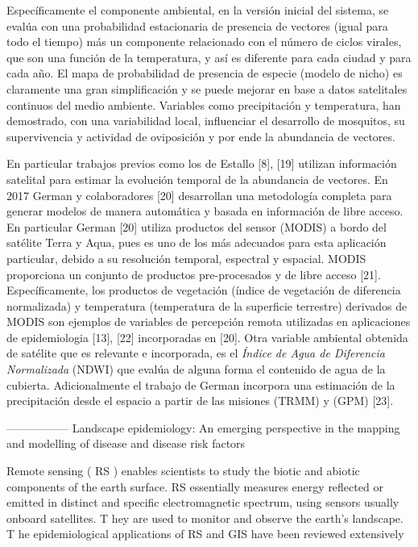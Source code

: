 Específicamente el componente ambiental, en la versión inicial del sistema, se
evalúa con una probabilidad estacionaria de presencia de vectores (igual para
todo el tiempo) más un componente relacionado con el número de ciclos virales,
que son una función de la temperatura, y así es diferente para cada ciudad y
para cada año. El mapa de probabilidad de presencia de especie (modelo de nicho)
es claramente una gran simplificación y se puede mejorar en base a datos
satelitales continuos del medio ambiente. Variables como precipitación y
temperatura, han demostrado, con una variabilidad local, influenciar el
desarrollo de mosquitos, su supervivencia y actividad de oviposición y por ende
la abundancia de vectores.

En particular trabajos previos como los de Estallo [8], [19] utilizan información
satelital para estimar la evolución temporal de la abundancia de vectores.
En 2017 German y colaboradores [20] desarrollan una metodología completa
para generar modelos de manera automática y basada en información de libre
acceso. En particular German [20] utiliza productos del sensor (MODIS) a bordo
del satélite Terra y Aqua, pues es uno de los más adecuados para esta
aplicación particular, debido a su resolución temporal, espectral y espacial.
MODIS proporciona un conjunto de productos pre-procesados y de libre acceso [21].
Específicamente, los productos de vegetación (índice de vegetación de diferencia
normalizada) y temperatura (temperatura de la superficie terrestre) derivados
de MODIS son ejemplos de variables de percepción remota utilizadas
en aplicaciones de epidemiologia [13], [22] incorporadas en [20]. Otra variable
ambiental obtenida de satélite que es relevante e incorporada, es el
\textit{Índice de Agua de Diferencia Normalizada} (NDWI) que evalúa de alguna
forma el contenido de agua de la cubierta. Adicionalmente el trabajo de German
incorpora una estimación de la precipitación desde el espacio a partir de las
misiones (TRMM) y (GPM) [23].



-----------------
Landscape epidemiology: An emerging perspective in the mapping and
modelling of disease and disease risk factors

Remote sensing ( RS ) enables scientists to study the biotic
and abiotic components of the earth surface. RS essentially
measures energy reflected or emitted in distinct and
specific electromagnetic spectrum, using sensors usually
onboard satellites. T hey are used to monitor and observe the
earth’s landscape. T he epidemiological applications of RS
and GIS have been reviewed extensively

